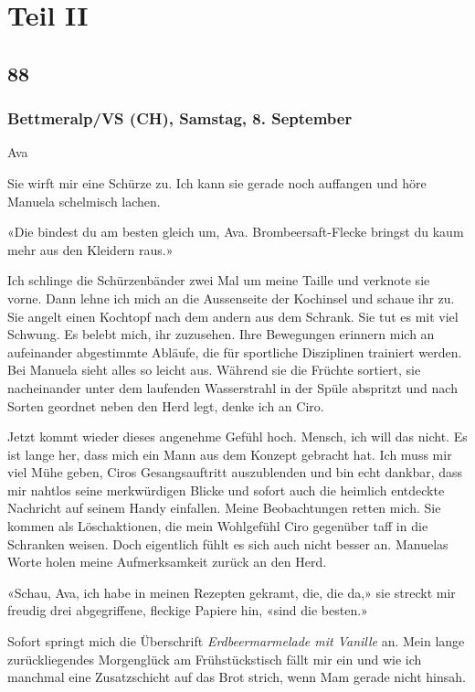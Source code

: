 \part{\texorpdfstring{Teil II }{Teil II }}\label{teil-ii}

\chapter{88}\label{section-88}

\section{Bettmeralp/VS (CH), Samstag, 8.
September}\label{bettmeralpvs-ch-samstag-8.-september}

Ava

Sie wirft mir eine Schürze zu. Ich kann sie gerade noch auffangen und
höre Manuela schelmisch lachen.

«Die bindest du am besten gleich um, Ava. Brombeersaft-Flecke bringst du
kaum mehr aus den Kleidern raus.»

Ich schlinge die Schürzenbänder zwei Mal um meine Taille und verknote
sie vorne. Dann lehne ich mich an die Aussenseite der Kochinsel und
schaue ihr zu. Sie angelt einen Kochtopf nach dem andern aus dem
Schrank. Sie tut es mit viel Schwung. Es belebt mich, ihr zuzusehen.
Ihre Bewegungen erinnern mich an aufeinander abgestimmte Abläufe, die
für sportliche Disziplinen trainiert werden. Bei Manuela sieht alles so
leicht aus. Während sie die Früchte sortiert, sie nacheinander unter dem
laufenden Wasserstrahl in der Spüle abspritzt und nach Sorten geordnet
neben den Herd legt, denke ich an Ciro.

Jetzt kommt wieder dieses angenehme Gefühl hoch. Mensch, ich will das
nicht. Es ist lange her, dass mich ein Mann aus dem Konzept gebracht
hat. Ich muss mir viel Mühe geben, Ciros Gesangsauftritt auszublenden
und bin echt dankbar, dass mir nahtlos seine merkwürdigen Blicke und
sofort auch die heimlich entdeckte Nachricht auf seinem Handy einfallen.
Meine Beobachtungen retten mich. Sie kommen als Löschaktionen, die mein
Wohlgefühl Ciro gegenüber taff in die Schranken weisen. Doch eigentlich
fühlt es sich auch nicht besser an. Manuelas Worte holen meine
Aufmerksamkeit zurück an den Herd.

«Schau, Ava, ich habe in meinen Rezepten gekramt, die, die da,» sie
streckt mir freudig drei abgegriffene, fleckige Papiere hin, «sind die
besten.»

Sofort springt mich die Überschrift \emph{Erdbeermarmelade mit Vanille}
an. Mein lange zurückliegendes Morgenglück am Frühstückstisch fällt mir
ein und wie ich manchmal eine Zusatzschicht auf das Brot strich, wenn
Mam gerade nicht hinsah.

